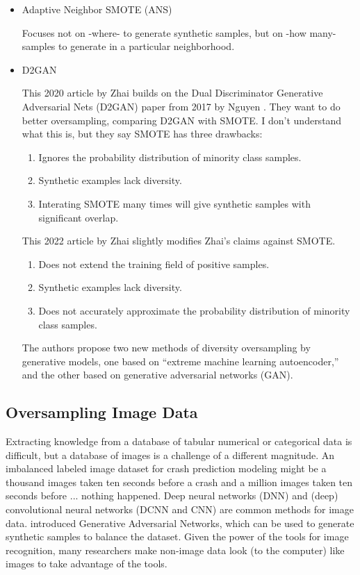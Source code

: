\begin{itemize}
			\item Adaptive Neighbor SMOTE (ANS)
			\cite{MAHMUDAH_2021}

			Focuses not on -where- to generate synthetic samples, but on -how many- samples to generate in a particular neighborhood. 

			\item D2GAN 

This 2020 article by Zhai \cite{ZHAI_2020_D2GAN} builds on the Dual Discriminator Generative Adversarial Nets (D2GAN) paper from 2017 by Nguyen \cite{NGUYEN_2017}.  They want to do better oversampling, comparing D2GAN with SMOTE.  I don't understand what this is, but they say SMOTE has three drawbacks:

\begin{enumerate}
	\item Ignores the probability distribution of minority class samples.
	\item Synthetic examples lack diversity.
	\item Interating SMOTE many times will give synthetic samples with significant overlap.
\end{enumerate}

This 2022 article by Zhai \cite{ZHAI_2022} slightly modifies Zhai's claims against SMOTE.

\begin{enumerate}
	\item Does not extend the training field of positive samples.
	\item Synthetic examples lack diversity.
	\item Does not accurately approximate the probability distribution of minority class samples.
\end{enumerate}

The authors propose two new methods of diversity oversampling by generative models, one based on ``extreme machine learning autoencoder,'' and the other based on generative adversarial networks (GAN).  

			
		\end{itemize}
		
\subsection{Oversampling Image Data}

Extracting knowledge from a database of tabular numerical or categorical data is difficult, but a database of images is a challenge of a different magnitude.  An imbalanced labeled image dataset for crash prediction modeling might be a thousand images taken ten seconds before a crash and a million images taken ten seconds before ... nothing happened.  Deep neural networks (DNN) and (deep) convolutional neural networks (DCNN and CNN) are common methods for image data.  \cite{NIPS2014_5ca3e9b1} introduced Generative Adversarial Networks, which can be used to generate synthetic samples to balance the dataset.  Given the power of the tools for image recognition, many researchers make non-image data look (to the computer) like images to take advantage of the tools.  



